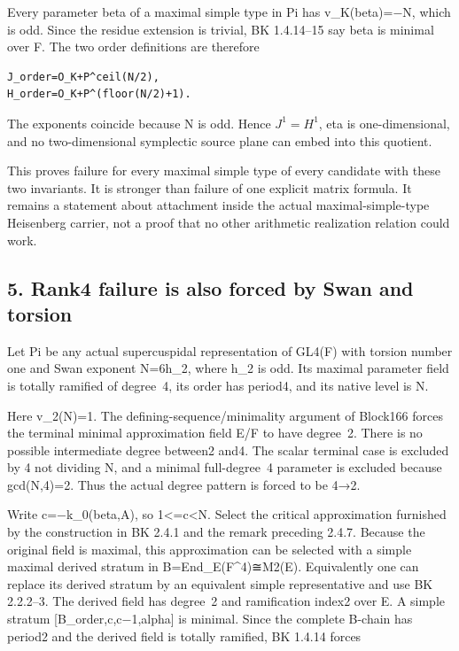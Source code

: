Every parameter beta of a maximal simple type in Pi has v\_K(beta)=−N,
which is odd. Since the residue extension is trivial, BK 1.4.14--15 say
beta is minimal over F. The two order definitions are therefore

\begin{Verbatim}[fontsize=\small,breaklines=true,breakanywhere=true]
J_order=O_K+P^ceil(N/2),
H_order=O_K+P^(floor(N/2)+1).
\end{Verbatim}

The exponents coincide because N is odd. Hence \(J^1=H^1\),
eta is one-dimensional, and no two-dimensional symplectic source plane
can embed into this quotient.

This proves failure for every maximal simple type of every candidate
with these two invariants. It is stronger than failure of one explicit
matrix formula. It remains a statement about attachment inside the
actual maximal-simple-type Heisenberg carrier, not a proof that no other
arithmetic realization relation could work.

\hypertarget{dyadic_capacity-rank4-failure-is-also-forced-by-swan-and-torsion}{%
\subsection{5. Rank4 failure is also forced by Swan and
torsion}\label{dyadic_capacity-rank4-failure-is-also-forced-by-swan-and-torsion}}

Let Pi be any actual supercuspidal representation of GL4(F) with torsion
number one and Swan exponent N=6h\_2, where h\_2 is odd. Its maximal
parameter field is totally ramified of degree~4, its order has period4,
and its native level is N.

Here v\_2(N)=1. The defining-sequence/minimality argument of Block166
forces the terminal minimal approximation field E/F to have degree~2.
There is no possible intermediate degree between2 and4. The scalar
terminal case is excluded by 4 not dividing N, and a minimal
full-degree~4 parameter is excluded because gcd(N,4)=2. Thus the actual
degree pattern is forced to be 4→2.

Write c=−k\_0(beta,A), so 1\textless=c\textless N. Select the critical
approximation furnished by the construction in BK 2.4.1 and the remark
preceding 2.4.7. Because the original field is maximal, this
approximation can be selected with a simple maximal derived stratum in
B=End\_E(F\^{}4)≅M2(E). Equivalently one can replace its derived stratum
by an equivalent simple representative and use BK 2.2.2--3. The derived
field has degree~2 and ramification index2 over E. A simple stratum
{[}B\_order,c,c−1,alpha{]} is minimal. Since the complete B-chain has
period2 and the derived field is totally ramified, BK 1.4.14 forces


